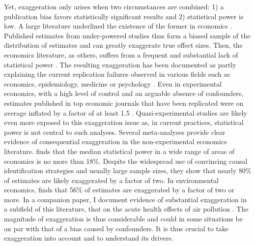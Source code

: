 			Yet, exaggeration only arises when two circumstances are combined: 1) a publication bias favors statistically significant results and 2) statistical power is low. A large literature underlined the existence of the former in economics \citep[for instance]{rosenthal_file_1979, andrews_identification_2019, abadie_statistical_2020, brodeur_methods_2020}. Published estimates from under-powered studies thus form a biased sample of the distribution of estimates and can greatly exaggerate true effect sizes. Then, the economics literature, as others, suffers from a frequent and substantial lack of statistical power \citep{ioannidis_power_2017, ferraro_featureis_2020}. The resulting exaggeration has been documented as partly explaining the current replication failures observed in various fields such as economics, epidemiology, medicine or psychology \citep{button_power_2013, open_science_collaboration_estimating_2015, camerer_evaluating_2016, chang_is_2022}. Even in experimental economics, with a high level of control and an arguable absence of confounders, estimates published in top economic journals that have been replicated were on average inflated by a factor of at least 1.5 \citep{camerer_evaluating_2016}. Quasi-experimental studies are likely even more exposed to this exaggeration issue as, in current practices, statistical power is not central to such analyses. Several meta-analyses provide clear evidence of consequential exaggeration in the non-experimental economics literature. \cite{ioannidis_power_2017} finds that the median statistical power in a wide range of areas of economics is no more than 18\%. Despite the widespread use of convincing causal identification strategies and usually large sample sizes, they show that nearly 80\% of estimates are likely exaggerated by a factor of two. In environmental economics, \cite{ferraro_featureis_2020} finds that 56\% of estimates are exaggerated by a factor of two or more. In a companion paper, I document evidence of substantial exaggeration in a subfield of this literature, that on the acute health effects of air pollution \citep{bagilet_accurately_2023}. The magnitude of exaggeration is thus considerable and could in some situations be on par with that of a bias caused by confounders. 
			It is thus crucial to take exaggeration into account and to understand its drivers.
			

